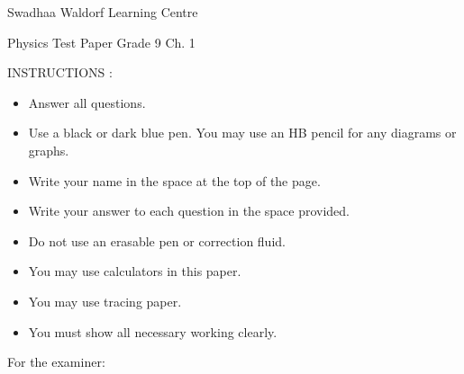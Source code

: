 \documentclass[12pt,addpoints]{exam}
\begin{document}
\begin{coverpages}

\begin{center}
  \begin{Large}
\vspace{-0.3in}
Swadhaa Waldorf Learning Centre

Physics Test Paper Grade 9 Ch. 1

\end{Large}
\end{center}

\vspace{0.5in}

\begin{center} 
  \bigskip

  INSTRUCTIONS :
  \begin{itemize}
    \item Answer all questions.
    \item Use a black or dark blue pen. You may use an HB pencil for any diagrams or graphs.
    \item Write your name in the space at the top of the page.
    \item Write your answer to each question in the space provided.
    \item Do not use an erasable pen or correction fluid.
    \item You may use calculators in this paper.
    \item You may use tracing paper.
	\item You must show all necessary working clearly.
  \end{itemize}


\end{center}

\vspace{1.1in}
For the examiner:
\begin{center}
\begin{small}
\begingroup
\endgroup
\end{small}
\end{center}


\end{coverpages}
\end{document}
